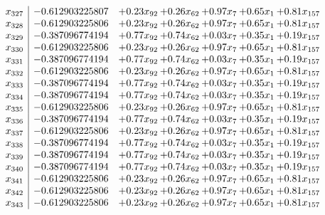 \documentclass[8pt]{article}
\begin{document}
\[\begin{array}{c| c c@{\hskip 2pt} c@{\hskip 2pt} c@{\hskip 2pt} c@{\hskip 2pt} c@{\hskip 2pt} }
 x_{327}   &  -0.612903225807 & +  0.23 x_{92} & +  0.26 x_{62} & +  0.97 x_{7} & +  0.65 x_{1} & +  0.81 x_{157}\\
 x_{328}   &  -0.612903225806 & +  0.23 x_{92} & +  0.26 x_{62} & +  0.97 x_{7} & +  0.65 x_{1} & +  0.81 x_{157}\\
 x_{329}   &  -0.387096774194 & +  0.77 x_{92} & +  0.74 x_{62} & +  0.03 x_{7} & +  0.35 x_{1} & +  0.19 x_{157}\\
 x_{330}   &  -0.612903225806 & +  0.23 x_{92} & +  0.26 x_{62} & +  0.97 x_{7} & +  0.65 x_{1} & +  0.81 x_{157}\\
 x_{331}   &  -0.387096774194 & +  0.77 x_{92} & +  0.74 x_{62} & +  0.03 x_{7} & +  0.35 x_{1} & +  0.19 x_{157}\\
 x_{332}   &  -0.612903225806 & +  0.23 x_{92} & +  0.26 x_{62} & +  0.97 x_{7} & +  0.65 x_{1} & +  0.81 x_{157}\\
 x_{333}   &  -0.387096774194 & +  0.77 x_{92} & +  0.74 x_{62} & +  0.03 x_{7} & +  0.35 x_{1} & +  0.19 x_{157}\\
 x_{334}   &  -0.387096774194 & +  0.77 x_{92} & +  0.74 x_{62} & +  0.03 x_{7} & +  0.35 x_{1} & +  0.19 x_{157}\\
 x_{335}   &  -0.612903225806 & +  0.23 x_{92} & +  0.26 x_{62} & +  0.97 x_{7} & +  0.65 x_{1} & +  0.81 x_{157}\\
 x_{336}   &  -0.387096774194 & +  0.77 x_{92} & +  0.74 x_{62} & +  0.03 x_{7} & +  0.35 x_{1} & +  0.19 x_{157}\\
 x_{337}   &  -0.612903225806 & +  0.23 x_{92} & +  0.26 x_{62} & +  0.97 x_{7} & +  0.65 x_{1} & +  0.81 x_{157}\\
 x_{338}   &  -0.387096774194 & +  0.77 x_{92} & +  0.74 x_{62} & +  0.03 x_{7} & +  0.35 x_{1} & +  0.19 x_{157}\\
 x_{339}   &  -0.387096774194 & +  0.77 x_{92} & +  0.74 x_{62} & +  0.03 x_{7} & +  0.35 x_{1} & +  0.19 x_{157}\\
 x_{340}   &  -0.387096774194 & +  0.77 x_{92} & +  0.74 x_{62} & +  0.03 x_{7} & +  0.35 x_{1} & +  0.19 x_{157}\\
 x_{341}   &  -0.612903225806 & +  0.23 x_{92} & +  0.26 x_{62} & +  0.97 x_{7} & +  0.65 x_{1} & +  0.81 x_{157}\\
 x_{342}   &  -0.612903225806 & +  0.23 x_{92} & +  0.26 x_{62} & +  0.97 x_{7} & +  0.65 x_{1} & +  0.81 x_{157}\\
 x_{343}   &  -0.612903225806 & +  0.23 x_{92} & +  0.26 x_{62} & +  0.97 x_{7} & +  0.65 x_{1} & +  0.81 x_{157}\\

\end{array}\]
\end{document}
